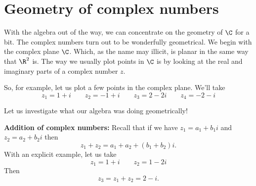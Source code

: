         \section{Geometry of complex numbers}
        
        With the algebra out of the way, we can concentrate on the geometry of $\C$ for a bit.  The complex numbers turn out to be wonderfully geometrical. We begin with the complex plane $\C$.  Which, as the name may illicit, is planar in the same way that $\R^2$ is.  The way we usually plot points in $\C$ is by looking at the real and imaginary parts of a complex number $z$.  
        
        \begin{center}
        \end{center}
        
        So, for example, let us plot a few points in the complex plane. We'll take
        \[
        z_1=1+i \qquad z_2=-1+i \qquad z_3=2-2i \qquad z_4=-2-i
        \]
        
        \begin{center}
        \end{center}
        
        Let us investigate what our algebra was doing geometrically!
        
        \noindent\textbf{Addition of complex numbers:} Recall that if we have $z_1=a_1+b_1 i$ and $z_2=a_2+b_2 i$ then
        \[
        z_1+z_2 = a_1+a_2 + (b_1 +b_2)i.
        \]
        With an explicit example, let us take
        \[
        z_1 = 1+i \qquad z_2=1-2i
        \]
        Then
        \[
        z_3=z_1+z_2=2-i.
        \]
        
